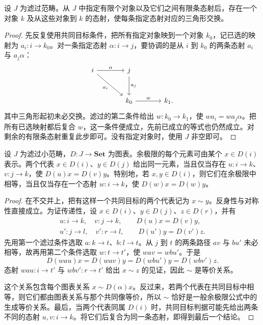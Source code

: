 \begin{lemma}[有限数据的共同比较]\label{b4:lem:filtered-finite-data}
	设 \(J\) 为滤过范畴。从 \(J\) 中指定有限个对象以及它们之间有限条态射后，存在一个对象 \(k\) 及从这些对象到 \(k\) 的态射，使每条指定态射对应的三角形交换。
\end{lemma}
\begin{proof}
	先反复使用共同目标条件，把所有指定对象映到一个对象 \(k_0\)，记已选的映射为 \(a_i:i\rightarrow k_0\)。对一条指定态射 \(\alpha:i\rightarrow j\)，要协调的是从 \(i\) 到 \(k_0\) 的两条态射 \(a_i\) 与 \(a_j\alpha\)：
	\[
		\begin{tikzcd}[column sep=large,row sep=large]
			i\arrow[r,"\alpha"]\arrow[dr,"a_i"']&j\arrow[d,"a_j"]&\\
			&k_0\arrow[r,"w"]&k_1.
		\end{tikzcd}
	\]
	其中三角形起初未必交换。滤过的第二条件给出 \(w:k_0\rightarrow k_1\)，使 \(wa_i=wa_j\alpha\)。把所有已选映射都后复合 \(w\)，这一条件便成立，先前已成立的等式也仍然成立。对剩余的有限条态射重复此步即可。没有指定对象时，使用 \(J\) 非空即可。
\end{proof}

\begin{proposition}[滤过余极限的元素判据]\label{b4:prop:filtered-colimit-elements}
	设 \(J\) 为滤过小范畴，\(D:J\rightarrow\mathbf{Set}\) 为图表。余极限的每个元素可由某个 \(x\in D(i)\) 表示。两个代表 \(x\in D(i)\)、\(y\in D(j)\) 给出同一元素，当且仅当存在 \(u:i\rightarrow k\)、\(v:j\rightarrow k\)，使 \(D(u)x=D(v)y\)。特别地，若 \(x,y\in D(i)\)，则它们在余极限中相等，当且仅当存在一个态射 \(w:i\rightarrow k\)，使 \(D(w)x=D(w)y\)。
\end{proposition}
\begin{proof}
	在不交并上，把有这样一个共同目标的两个代表记为 \(x\sim y\)。反身性与对称性直接成立。为证传递性，设 \(x\in D(i)\)、\(y\in D(j)\)、\(z\in D(r)\)，并有
	\[
		\begin{gathered}
			u:i\rightarrow k,\quad v:j\rightarrow k,\qquad D(u)x=D(v)y,\\
			u':j\rightarrow l,\quad v':r\rightarrow l,\qquad D(u')y=D(v')z.
		\end{gathered}
	\]
	先用第一个滤过条件选取 \(a:k\rightarrow t\)、\(b:l\rightarrow t\)。从 \(j\) 到 \(t\) 的两条路径 \(av\) 与 \(bu'\) 未必相等，故再用第二个条件选取 \(w:t\rightarrow t'\)，使 \(wav=wbu'\)。于是
	\[
		D(wau)x=D(wav)y=D(wbu')y=D(wbv')z.
	\]
	态射 \(wau:i\rightarrow t'\) 与 \(wbv':r\rightarrow t'\) 给出 \(x\sim z\) 的见证，因此 \(\sim\) 是等价关系。

	这个关系包含每个图表关系 \(x\sim D(\alpha)x\)。反过来，若两个代表在共同目标中相等，则它们都由图表关系与那个共同像等价，所以 \(\sim\) 恰好是一般余极限公式中的生成等价关系。最后，当两个代表同属 \(D(i)\) 时，共同目标判据可能先给出两条不同的态射 \(u,v:i\rightarrow k\)。将它们后复合为同一条态射，即得到最后一个结论。
\end{proof}

